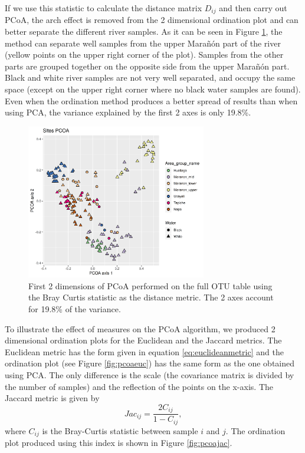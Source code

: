 If we use this statistic to calculate the distance matrix $D_{ij}$ and then carry out PCoA, the arch effect is removed from the 2 dimensional ordination plot and can better separate the different river samples. As it can be seen in Figure \ref{fig:pcoaotu12}, the method can separate well samples from the upper Marañón part of the river (yellow points on the upper right corner of the plot). Samples from the other parts are grouped together on the opposite side from the upper Marañón part. Black and white river samples are not very well separated, and occupy the same space (except on the upper right corner where no black water samples are found). Even when the ordination method produces a better spread of results than when using PCA, the variance explained by the first 2 axes is only 19.8\%.


\begin{figure}[h]
\centering
\includegraphics[width = 0.7\textwidth]{pcoaotu12}
\caption{First 2 dimensions of PCoA performed on the full OTU table using the Bray Curtis statistic as the distance metric. The 2 axes account for 19.8\% of the variance.}
\label{fig:pcoaotu12}
\end{figure}

To illustrate the effect of measures on the PCoA algorithm, we produced 2 dimensional ordination plots for the Euclidean and the Jaccard metrics. The Euclidean metric has the form given in equation \eqref{eq:euclideanmetric} and the ordination plot (see Figure \ref{fig:pcoaeuc}) has the same form as the one obtained using PCA. The only difference is the scale (the covariance matrix is divided by the number of samples) and the reflection of the points on the x-axis. The Jaccard metric is given by
\begin{equation}
Jac_{ij} =\frac{2C_{ij}}{1-C_{ij}},
\end{equation} 
where $C_{ij}$ is the Bray-Curtis statistic between sample $i$ and $j$. The ordination plot produced using this index is shown in Figure \ref{fig:pcoajac}.

